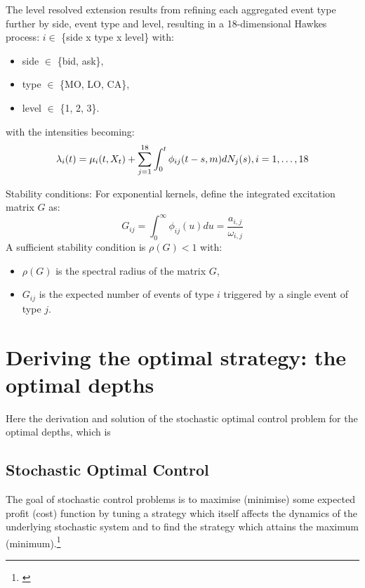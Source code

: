 \documentclass[12pt,a4paper]{cau_thesis}
\begin{document}
The level resolved extension results from refining each aggregated
event type further by side, event type and level, resulting in a
18-dimensional Hawkes process: $i \in$ \{side x type x level\} with:
\begin{itemize}
    \item side $\in$ \{bid, ask\},
    \item type $\in$ \{MO, LO, CA\},
    \item level $\in$ \{1, 2, 3\}.
\end{itemize}
with the intensities becoming:
\begin{equation}
    \lambda_{i}(t) = \mu_{i}(t, X_{t}) + \sum_{j=1}^{18} \int_{0}^{t} \phi_{ij}(t - s, m) dN_{j}(s),\\
    i = 1, \ldots, 18
\end{equation}

Stability conditions: For exponential kernels, define the integrated
excitation matrix $G$ as:
\begin{equation}
    G_{ij} = \int_{0}^{\infty} \phi_{ij}(u) du = \frac{a_{i, j}}{\omega_{i, j}}
\end{equation}
A sufficient stability condition is $\rho(G) < 1$
with:
\begin{itemize}
    \item $\rho(G)$ is the spectral radius of the matrix $G$,
    \item $G_{ij}$ is the expected number of events of type $i$ triggered by a single event of type $j$.
\end{itemize}

\section{Deriving the optimal strategy: the optimal depths}\label{sec:optimal_depths}
Here the derivation and solution of the stochastic optimal control
problem for the optimal depths, which is

\subsection{Stochastic Optimal Control}\label{sub_sec:stochastic_optimal_control}
The goal of stochastic control problems is to maximise (minimise)
some expected profit (cost) function by tuning a strategy which
itself affects the dynamics of the underlying stochastic system and
to find the strategy which attains the maximum
(minimum).\footnote{\cite[See ][, p.100]{cartea2015algorithmic}}
\end{document}
